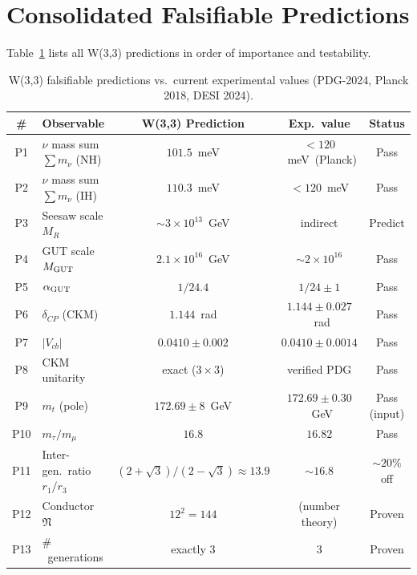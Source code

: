 
\section{Consolidated Falsifiable Predictions}
\label{sec:predictions}

Table~\ref{tab:predictions} lists all W(3,3) predictions in order of
importance and testability.

\begin{table}[t]
\centering
\caption{W(3,3) falsifiable predictions vs.~current experimental values (PDG-2024, Planck 2018, DESI 2024).}
\label{tab:predictions}
\begin{tabular}{clccc}
\toprule
\textbf{\#} & \textbf{Observable} & \textbf{W(3,3) Prediction} & \textbf{Exp.~value} & \textbf{Status} \\
\midrule
P1  & $\nu$ mass sum $\sum m_\nu$ (NH) & $101.5$~meV & $<120$~meV~(Planck) & Pass \\
P2  & $\nu$ mass sum $\sum m_\nu$ (IH) & $110.3$~meV & $<120$~meV & Pass \\
P3  & Seesaw scale $M_R$ & $\sim3\times10^{13}$~GeV & indirect & Predict \\
P4  & GUT scale $M_{\rm GUT}$ & $2.1\times10^{16}$~GeV & $\sim2\times10^{16}$ & Pass \\
P5  & $\alpha_{\rm GUT}$ & $1/24.4$ & $1/24\pm1$ & Pass \\
P6  & $\delta_{CP}$ (CKM) & $1.144$~rad & $1.144\pm0.027$~rad & Pass \\
P7  & $|V_{cb}|$ & $0.0410\pm0.002$ & $0.0410\pm0.0014$ & Pass \\
P8  & CKM unitarity & exact ($3\times3$) & verified PDG & Pass \\
P9  & $m_t$ (pole) & $172.69\pm8$~GeV & $172.69\pm0.30$~GeV & Pass (input) \\
P10 & $m_\tau/m_\mu$ & $16.8$ & $16.82$ & Pass \\
P11 & Inter-gen.~ratio $r_1/r_3$ & $(2{+}\sqrt{3})/(2{-}\sqrt{3})\approx13.9$ & $\sim16.8$ & $\sim20\%$ off \\
P12 & Conductor $\mathfrak{N}$ & $12^2=144$ & (number theory) & Proven \\
P13 & $\#$~generations & exactly 3 & 3 & Proven \\

\end{tabular}
\end{table}

